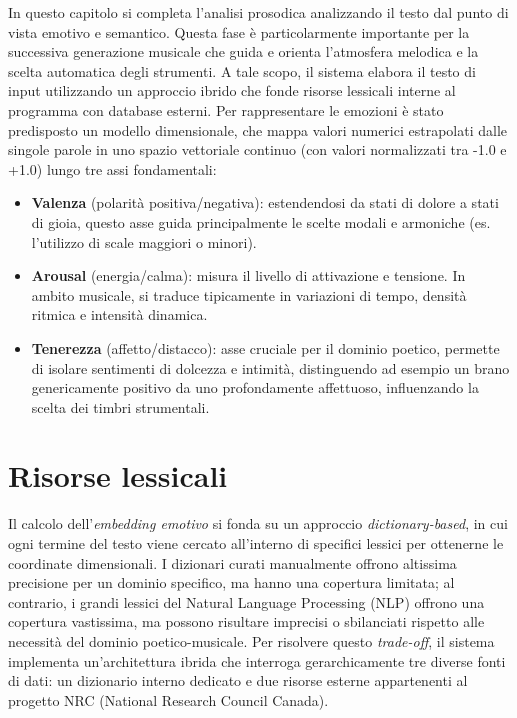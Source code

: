 In questo capitolo si completa l'analisi prosodica analizzando il testo dal punto di vista emotivo e semantico. 
Questa fase è particolarmente importante per la successiva  generazione musicale che guida e orienta l'atmosfera melodica e la scelta automatica 
degli strumenti. A tale scopo, il sistema elabora il testo di input utilizzando un approccio ibrido che fonde risorse lessicali interne al programma 
con database esterni. Per rappresentare le emozioni è stato predisposto un modello dimensionale, che mappa valori numerici estrapolati dalle singole 
parole in uno spazio vettoriale continuo (con valori normalizzati tra -1.0 e +1.0) lungo tre assi fondamentali: 
\begin{itemize}
    \item \textbf{Valenza} (polarità positiva/negativa): estendendosi da stati di dolore a stati di gioia, questo asse guida principalmente le scelte modali 
    e armoniche (es. l'utilizzo di scale maggiori o minori).
    \item \textbf{Arousal} (energia/calma): misura il livello di attivazione e tensione. In ambito musicale, si traduce tipicamente in variazioni di tempo, 
    densità ritmica e intensità dinamica.
    \item \textbf{Tenerezza} (affetto/distacco): asse cruciale per il dominio poetico, permette di isolare sentimenti di dolcezza e intimità, distinguendo 
    ad esempio un brano genericamente positivo da uno profondamente affettuoso, influenzando la scelta dei timbri strumentali.
\end{itemize}



\section{Risorse lessicali}
Il calcolo dell'\textit{embedding emotivo} si fonda su un approccio \textit{dictionary-based}, in cui ogni termine del testo viene cercato all'interno di 
specifici lessici per ottenerne le coordinate dimensionali. I dizionari curati manualmente offrono altissima precisione per un dominio specifico, ma hanno 
una copertura limitata; al contrario, i grandi lessici del Natural Language Processing (NLP) offrono una copertura vastissima, ma possono risultare 
imprecisi o sbilanciati rispetto alle necessità del dominio poetico-musicale. Per risolvere questo \textit{trade-off}, il sistema implementa un'architettura 
ibrida che interroga gerarchicamente tre diverse fonti di dati: un dizionario interno dedicato e due risorse esterne appartenenti al progetto NRC 
(National Research Council Canada).


